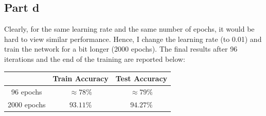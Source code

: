 \documentclass{article}
\begin{document}
\subsection*{Part d}
\begin{flushleft}
Clearly, for the same learning rate and the same number of epochs, it would be hard to view similar performance. Hence, I change the learning rate (to 0.01) and train the network for a bit longer (2000 epochs). The final results after 96 iterations and the end of the training are reported below:
\begin{center}
\begin{tabular}{|c|c|c|}
\hline
& Train Accuracy & Test Accuracy \\
\hline
\hline
96 epochs & \(\approx 78\%\) & \(\approx 79\%\) \\
\hline
2000 epochs & \(93.11\%\) & \(94.27\%\) \\
\hline
\end{tabular}
\end{center}


\end{flushleft}
\end{document}
